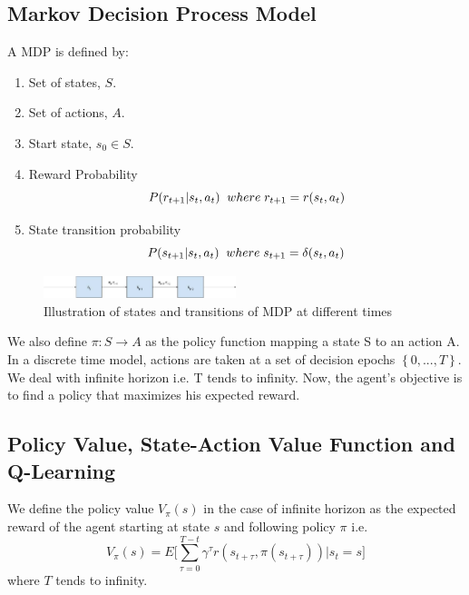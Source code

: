 \documentclass[conference]{IEEEtran}
\begin{document}
\subsection{Markov Decision Process Model}
A MDP is defined by:
\begin{enumerate}
    \item Set of states, $S$.
    \item Set of actions, $A$.
    \item Start state, $s_{0} \in S$.
    \item Reward Probability  
    \[P(r_{t+1} | s_{t}, a_{t}) \hspace{0.2cm} where \hspace{0.1cm} r_{t+1} = r(s_{t}, a_{t})\]
    \item State transition probability
    \[P(s_{t+1} | s_{t}, a_{t}) \hspace{0.2cm} where \hspace{0.1cm} s_{t+1} = \delta(s_{t}, a_{t})\]
\end{enumerate}

\begin{figure}[h]
\includegraphics[width=0.5\textwidth]{mdpm}
\caption[width=\textwidth]{Illustration of states and transitions of MDP at different times}
\label{fig:mdpm}
\end{figure}

We also define $\pi:S \rightarrow A$ as the policy function mapping a state S to an action A. In a discrete time model, actions are taken at a set of decision epochs $\left \{ 0, ..., T \right \}$. We deal with infinite horizon i.e. T tends to infinity. Now, the agent's objective is to find a policy that maximizes his expected reward.


\subsection{Policy Value, State-Action Value Function and Q-Learning}
We define the policy value  $V_{\pi}(s)$ in the case of infinite horizon as the expected reward of the agent starting at state $s$ and following policy $\pi$ i.e.
\begin{equation} \label{eq:polVal}
V_{\pi}(s) = E\bigg[ \sum_{\tau=0}^{T-t} \gamma^\tau r(s_{t+\tau}, \pi(s_{t+\tau})) | s_{t} = s \bigg]
\end{equation}
where $T$ tends to infinity.
\end{document}
